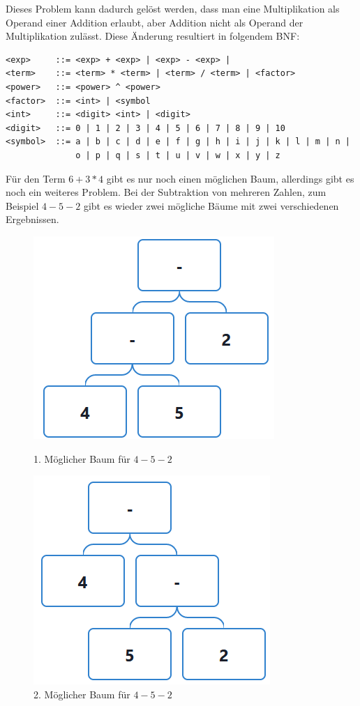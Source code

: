 \documentclass[11pt]{article}
\begin{document}
Dieses Problem kann dadurch gelöst werden, dass man eine Multiplikation als 
Operand einer Addition erlaubt, aber Addition nicht als Operand der Multiplikation 
zulässt. Diese Änderung resultiert in folgendem BNF:

\begin{verbatim}
<exp>     ::= <exp> + <exp> | <exp> - <exp> | 
<term>    ::= <term> * <term> | <term> / <term> | <factor>
<power>   ::= <power> ^ <power>
<factor>  ::= <int> | <symbol 
<int>     ::= <digit> <int> | <digit>
<digit>   ::= 0 | 1 | 2 | 3 | 4 | 5 | 6 | 7 | 8 | 9 | 10
<symbol>  ::= a | b | c | d | e | f | g | h | i | j | k | l | m | n | 
              o | p | q | s | t | u | v | w | x | y | z
\end{verbatim}

Für den Term $6+3*4$ gibt es nur noch einen möglichen Baum,
allerdings gibt es noch ein weiteres Problem. 
Bei der Subtraktion von mehreren Zahlen, 
zum Beispiel $4-5-2$ gibt es wieder zwei mögliche Bäume 
mit zwei verschiedenen Ergebnissen. 

\begin{figure}[h]
\begin{minipage}{.5\textwidth}
  \centering
  \includegraphics[scale=0.5]{trees/beispiel_bnf_3_1.png}
  \caption{1. Möglicher Baum für $4-5-2$}
\end{minipage}
\begin{minipage}{.5\textwidth}
  \centering
  \includegraphics[scale=0.5]{trees/beispiel_bnf_3_2.png}
  \caption{2. Möglicher Baum für $4-5-2$}
\end{minipage}
\end{figure}
\end{document}
